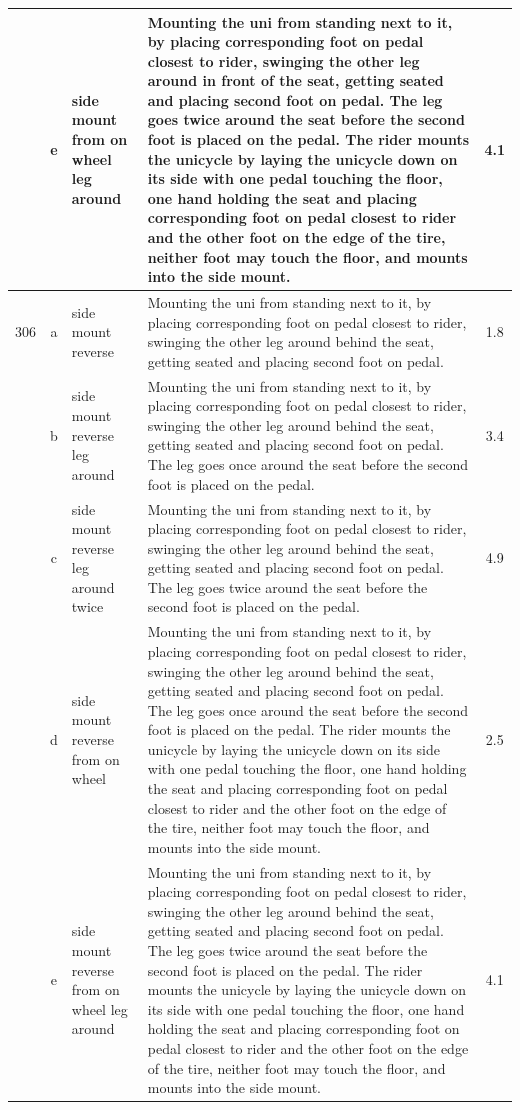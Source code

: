 \begin{longtable}{|r|c|p{4cm}|p{8cm}|c|}
\hline
  & e & side mount from on wheel leg around & Mounting the uni from standing next to it, by placing corresponding foot on pedal closest to rider, swinging the other leg around in front of the seat, getting seated and placing second foot on pedal. The leg goes twice around the seat before the second foot is placed on the pedal. The rider mounts the unicycle by laying the unicycle down on its side with one pedal touching the floor, one hand holding the seat and placing corresponding foot on pedal closest to rider and the other foot on the edge of the tire, neither foot may touch the floor, and mounts into the side mount.  & 4.1 \\ 
\hline
306 & a & side mount reverse  & Mounting the uni from standing next to it, by placing corresponding foot on pedal closest to rider, swinging the other leg around behind the seat, getting seated and placing second foot on pedal. & 1.8 \\ 
\hline
  & b & side mount reverse leg around & Mounting the uni from standing next to it, by placing corresponding foot on pedal closest to rider, swinging the other leg around behind the seat, getting seated and placing second foot on pedal. The leg goes once around the seat before the second foot is placed on the pedal.  & 3.4 \\ 
\hline
  & c & side mount reverse leg around twice & Mounting the uni from standing next to it, by placing corresponding foot on pedal closest to rider, swinging the other leg around behind the seat, getting seated and placing second foot on pedal. The leg goes twice around the seat before the second foot is placed on the pedal. & 4.9 \\ 
\hline
  & d & side mount reverse from on wheel  & Mounting the uni from standing next to it, by placing corresponding foot on pedal closest to rider, swinging the other leg around behind the seat, getting seated and placing second foot on pedal. The leg goes once around the seat before the second foot is placed on the pedal. The rider mounts the unicycle by laying the unicycle down on its side with one pedal touching the floor, one hand holding the seat and placing corresponding foot on pedal closest to rider and the other foot on the edge of the tire, neither foot may touch the floor, and mounts into the side mount.  & 2.5 \\ 
\hline
  & e & side mount reverse from on wheel leg around & Mounting the uni from standing next to it, by placing corresponding foot on pedal closest to rider, swinging the other leg around behind the seat, getting seated and placing second foot on pedal. The leg goes twice around the seat before the second foot is placed on the pedal. The rider mounts the unicycle by laying the unicycle down on its side with one pedal touching the floor, one hand holding the seat and placing corresponding foot on pedal closest to rider and the other foot on the edge of the tire, neither foot may touch the floor, and mounts into the side mount. & 4.1 \\ 

\end{longtable}
